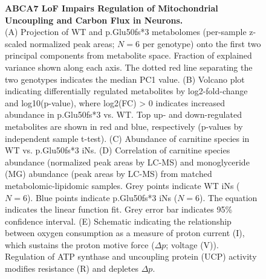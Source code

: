 \begin{figure}[ht]
    \caption{
        \textbf{ABCA7 LoF Impairs Regulation of Mitochondrial Uncoupling and Carbon Flux in Neurons.}\\[1ex]
        (A) Projection of WT and p.Glu50fs*3 metabolomes (per-sample z-scaled normalized peak areas; $N=6$ per genotype) onto the first two principal components from metabolite space. Fraction of explained variance shown along each axis. The dotted red line separating the two genotypes indicates the median PC1 value. 
        (B) Volcano plot indicating differentially regulated metabolites by log2-fold-change and log10(p-value), where log2(FC) > 0 indicates increased abundance in p.Glu50fs*3 vs. WT. Top up- and down-regulated metabolites are shown in red and blue, respectively (p-values by independent sample t-test). 
        (C) Abundance of carnitine species in WT vs. p.Glu50fs*3 iNs. 
        (D) Correlation of carnitine species abundance (normalized peak areas by LC-MS) and monoglyceride (MG) abundance (peak areas by LC-MS) from matched metabolomic-lipidomic samples. Grey points indicate WT iNs ($N=6$). Blue points indicate p.Glu50fs*3 iNs ($N=6$). The equation indicates the linear function fit. Grey error bar indicates 95\% confidence interval. 
        (E) Schematic indicating the relationship between oxygen consumption as a measure of proton current (I), which sustains the proton motive force ($\Delta p$; voltage (V)). Regulation of ATP synthase and uncoupling protein (UCP) activity modifies resistance (R) and depletes $\Delta p$. 
}
\end{figure}
